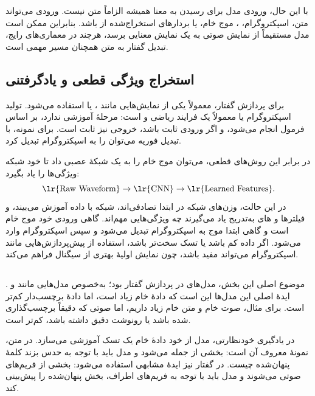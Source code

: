 با این حال، ورودی مدل برای رسیدن به معنا همیشه الزاماً متن نیست. ورودی می‌تواند متن، اسپکتروگرام، ، موج خام، یا بردارهای استخراج‌شده از  باشد. بنابراین ممکن است مدل مستقیماً از نمایش صوتی به یک نمایش معنایی برسد، هرچند در معماری‌های رایج، تبدیل گفتار به متن همچنان مسیر مهمی است.

\subsection{استخراج ویژگی قطعی و یادگرفتنی}
برای پردازش گفتار، معمولاً یکی از نمایش‌هایی مانند ،  یا  استفاده می‌شود. تولید اسپکتروگرام یا  معمولاً یک فرایند ریاضی و  است: مرحلهٔ آموزشی ندارد، بر اساس فرمول انجام می‌شود، و اگر ورودی ثابت باشد، خروجی نیز ثابت است. برای نمونه، با تبدیل فوریه می‌توان  را به اسپکتروگرام تبدیل کرد.

در برابر این روش‌های قطعی، می‌توان موج خام را به یک شبکهٔ عصبی داد تا خود شبکه ویژگی‌ها را یاد بگیرد:
\[
\text{\lr{Raw Waveform}}\rightarrow \text{\lr{CNN}}\rightarrow \text{\lr{Learned Features}}.
\]
در این حالت، وزن‌های شبکه در ابتدا تصادفی‌اند، شبکه با داده آموزش می‌بیند، و فیلترها و های  به‌تدریج یاد می‌گیرند چه ویژگی‌هایی مهم‌اند. گاهی ورودی  خود موج خام است و گاهی ابتدا موج به اسپکتروگرام تبدیل می‌شود و سپس اسپکتروگرام وارد  می‌شود. اگر داده کم باشد یا تسک سخت‌تر باشد، استفاده از پیش‌پردازش‌هایی مانند اسپکتروگرام می‌تواند مفید باشد، چون نمایش اولیهٔ بهتری از سیگنال فراهم می‌کند.

\subsection{}
موضوع اصلی این بخش، مدل‌های  در پردازش گفتار بود؛ به‌خصوص مدل‌هایی مانند  و . ایدهٔ اصلی این مدل‌ها این است که دادهٔ خام زیاد است، اما دادهٔ برچسب‌دار کم‌تر است. برای مثال، صوت خام و متن خام زیاد داریم، اما صوتی که دقیقاً برچسب‌گذاری شده باشد یا رونوشت دقیق داشته باشد، کم‌تر است.

در یادگیری خودنظارتی، مدل از خود دادهٔ خام یک تسک آموزشی می‌سازد. در متن، نمونهٔ معروف آن  است: بخشی از جمله  می‌شود و مدل باید با توجه به  حدس بزند کلمهٔ پنهان‌شده چیست. در گفتار نیز ایدهٔ مشابهی استفاده می‌شود: بخشی از فریم‌های صوتی  می‌شوند و مدل باید با توجه به فریم‌های اطراف، بخش پنهان‌شده را پیش‌بینی کند.

